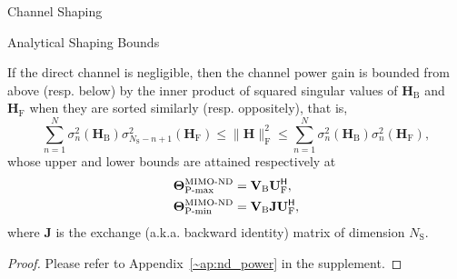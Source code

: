 \documentclass[journal]{IEEEtran}
\begin{document}
\begin{section}{Channel Shaping}
\begin{subsection}{Analytical Shaping Bounds}
		\begin{corollary}
			\label{co:nd_power}
			If the direct channel is negligible, then the channel power gain is bounded from above (resp. below) by the inner product of squared singular values of $\mathbf{H}_\mathrm{B}$ and $\mathbf{H}_\mathrm{F}$ when they are sorted similarly (resp. oppositely), that is,
			\begin{equation}
				\label{iq:power_nd}
				\sum_{n=1}^N \sigma_n^2(\mathbf{H}_\mathrm{B}) \sigma_{N_\mathrm{S}-n+1}^2(\mathbf{H}_\mathrm{F}) \le \lVert \mathbf{H} \rVert _\mathrm{F}^2 \le \sum_{n=1}^N \sigma_n^2(\mathbf{H}_\mathrm{B}) \sigma_n^2(\mathbf{H}_\mathrm{F}),
			\end{equation}
			whose upper and lower bounds are attained respectively at
			\begin{subequations}
				\label{eq:ris_nd_power}
				\begin{align}
					\mathbf{\Theta}_\textnormal{P-max}^\textnormal{MIMO-ND} & = \mathbf{V}_\mathrm{B} \mathbf{U}_\mathrm{F}^\mathsf{H}, \label{eq:ris_nd_power_max}            \\
					\mathbf{\Theta}_\textnormal{P-min}^\textnormal{MIMO-ND} & = \mathbf{V}_\mathrm{B} \mathbf{J} \mathbf{U}_\mathrm{F}^\mathsf{H} \label{eq:ris_nd_power_min},
				\end{align}
			\end{subequations}
			where $\mathbf{J}$ is the exchange (a.k.a. backward identity) matrix of dimension $N_\mathrm{S}$.
		\end{corollary}
		\begin{proof}
			Please refer to Appendix~\ref{~ap:nd_power} in the supplement.
		\end{proof}


\end{subsection}
\end{section}
\end{document}
